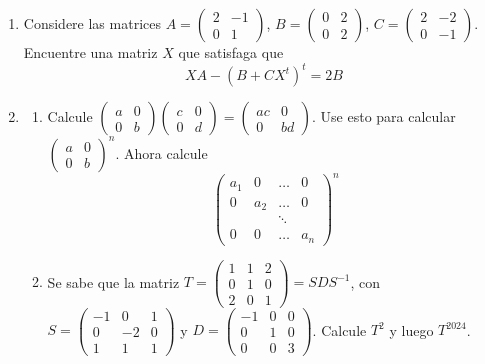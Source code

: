 \documentclass[a4paper]{article}
\begin{document}
\begin{enumerate}
\item Considere las matrices $ A= \begin{pmatrix} 2 & -1  \\ 0 & 1  \end{pmatrix} $, $B= \begin{pmatrix} 0 & 2  \\ 0 & 2  \end{pmatrix}$, $C= \begin{pmatrix} 2 & -2  \\ 0 & -1  \end{pmatrix}$. Encuentre una matriz $X$ que satisfaga que
$$ XA-(B+CX^t)^t=2B $$
\item 
\begin{enumerate}
\item Calcule $\begin{pmatrix} a & 0 \\ 0 & b \end{pmatrix}\begin{pmatrix} c & 0 \\ 0 & d \end{pmatrix}= \begin{pmatrix} ac & 0 \\ 0 & bd \end{pmatrix}$. Use esto para calcular $\begin{pmatrix} a & 0 \\ 0 & b \end{pmatrix}^n$. Ahora calcule 
        $$\begin{pmatrix} a_1 & 0 & \dots & 0 \\ 0 & a_2 & \dots & 0 \\ & & \ddots & \\ 0 & 0 & \dots & a_n \end{pmatrix}^n$$
        \item Se sabe que la matriz $T=\begin{pmatrix} 1 & 1 & 2 \\ 0 & 1 & 0 \\ 2 & 0 & 1 \end{pmatrix}= S D S^{-1}$, con $S=\begin{pmatrix} -1 & 0 & 1 \\ 0 & -2 & 0 \\ 1 & 1 & 1 \end{pmatrix}$ y $D= \begin{pmatrix} -1 & 0 & 0 \\ 0 & 1 & 0 \\ 0 & 0 & 3 \end{pmatrix}$. Calcule $T^{2}$ y luego $T^{2024}$. 
\end{enumerate}
\end{enumerate}
\end{document}
